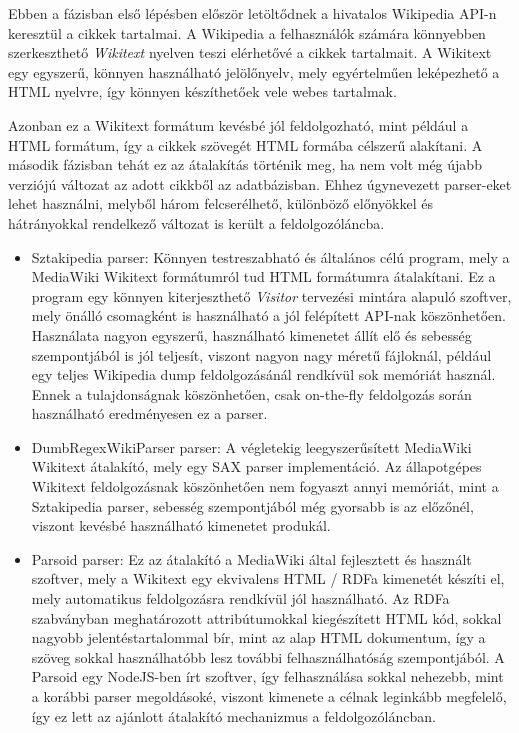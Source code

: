 Ebben a fázisban első lépésben először letöltődnek a hivatalos Wikipedia API-n keresztül a cikkek tartalmai. A Wikipedia a felhasználók számára könnyebben szerkeszthető \textit{Wikitext} nyelven teszi elérhetővé a cikkek tartalmait. A Wikitext egy egyszerű, könnyen használható jelölőnyelv, mely egyértelműen leképezhető a HTML nyelvre, így könnyen készíthetőek vele webes tartalmak.

Azonban ez a Wikitext formátum kevésbé jól feldolgozható, mint például a HTML formátum, így a cikkek szövegét HTML formába célszerű alakítani. A második fázisban tehát ez az átalakítás történik meg, ha nem volt még újabb verziójú változat az adott cikkből az adatbázisban. Ehhez úgynevezett parser-eket lehet használni, melyből három felcserélhető, különböző előnyökkel és hátrányokkal rendelkező változat is került a feldolgozóláncba.

\begin{itemize}
	\item Sztakipedia parser\cite{sztakipediaparser}: Könnyen testreszabható és általános célú program, mely a MediaWiki Wikitext formátumról tud HTML formátumra átalakítani. Ez a program egy könnyen kiterjeszthető \textit{Visitor} tervezési mintára alapuló szoftver, mely önálló csomagként is használható a jól felépített API-nak köszönhetően. Használata nagyon egyszerű, használható kimenetet állít elő és sebesség szempontjából is jól teljesít, viszont nagyon nagy méretű fájloknál, például egy teljes Wikipedia dump feldolgozásánál rendkívül sok memóriát használ. Ennek a tulajdonságnak köszönhetően, csak on-the-fly feldolgozás során használható eredményesen ez a parser.
	
	\item DumbRegexWikiParser parser: A végletekig leegyszerűsített MediaWiki Wikitext átalakító, mely egy SAX parser implementáció. Az állapotgépes Wikitext feldolgozásnak köszönhetően nem fogyaszt annyi memóriát, mint a Sztakipedia parser, sebesség szempontjából még gyorsabb is az előzőnél, viszont kevésbé használható kimenetet produkál.
	
	\item Parsoid parser: Ez az átalakító a MediaWiki által fejlesztett és használt szoftver, mely a Wikitext egy ekvivalens HTML / RDFa kimenetét készíti el, mely automatikus feldolgozásra rendkívül jól használható. Az RDFa szabványban meghatározott attribútumokkal kiegészített HTML kód, sokkal nagyobb jelentéstartalommal bír, mint az alap HTML dokumentum, így a szöveg sokkal használhatóbb lesz további felhasználhatóság szempontjából. A Parsoid egy NodeJS-ben írt szoftver, így felhasználása sokkal nehezebb, mint a korábbi parser megoldásoké, viszont kimenete a célnak leginkább megfelelő, így ez lett az ajánlott átalakító mechanizmus a feldolgozóláncban.
\end{itemize}

